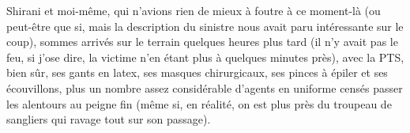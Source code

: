 %
%
Shirani et moi-même, qui n’avions rien de mieux à foutre à ce moment-là (ou peut-être que si, mais la description du sinistre nous avait paru intéressante sur le coup), sommes arrivés sur le terrain quelques heures plus tard (il n’y avait pas le feu, si j’ose dire, la victime n’en étant plus à quelques minutes près), avec la PTS, bien sûr, ses gants en latex, ses masques chirurgicaux, ses pinces à épiler et ses écouvillons, plus un nombre assez considérable d’agents en uniforme censés passer les alentours au peigne fin (même si, en réalité, on est plus près du troupeau de sangliers qui ravage tout sur son passage).

